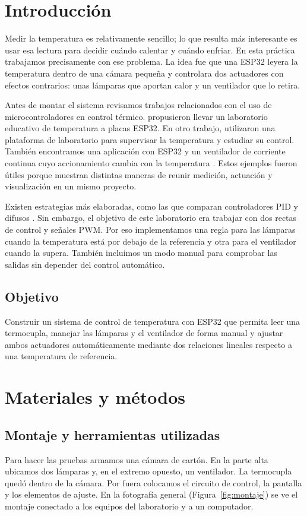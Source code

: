 \documentclass[11pt,letterpaper]{article}
\begin{document}
\section{Introducción}
Medir la temperatura es relativamente sencillo; lo que resulta más interesante es usar esa lectura para decidir cuándo calentar y cuándo enfriar. En esta práctica trabajamos precisamente con ese problema. La idea fue que una ESP32 leyera la temperatura dentro de una cámara pequeña y controlara dos actuadores con efectos contrarios: unas lámparas que aportan calor y un ventilador que lo retira.

Antes de montar el sistema revisamos trabajos relacionados con el uso de microcontroladores en control térmico. \textcite{fonseca2022} propusieron llevar un laboratorio educativo de temperatura a placas ESP32. En otro trabajo, \textcite{rahmat2023} utilizaron una plataforma de laboratorio para supervisar la temperatura y estudiar su control. También encontramos una aplicación con ESP32 y un ventilador de corriente continua cuyo accionamiento cambia con la temperatura \parencite{azmi2025}. Estos ejemplos fueron útiles porque muestran distintas maneras de reunir medición, actuación y visualización en un mismo proyecto.

Existen estrategias más elaboradas, como las que comparan controladores PID y difusos \parencite{salve2026}. Sin embargo, el objetivo de este laboratorio era trabajar con dos rectas de control y señales PWM. Por eso implementamos una regla para las lámparas cuando la temperatura está por debajo de la referencia y otra para el ventilador cuando la supera. También incluimos un modo manual para comprobar las salidas sin depender del control automático.

\subsection{Objetivo}
Construir un sistema de control de temperatura con ESP32 que permita leer una termocupla, manejar las lámparas y el ventilador de forma manual y ajustar ambos actuadores automáticamente mediante dos relaciones lineales respecto a una temperatura de referencia.

\section{Materiales y métodos}
\subsection{Montaje y herramientas utilizadas}
Para hacer las pruebas armamos una cámara de cartón. En la parte alta ubicamos dos lámparas y, en el extremo opuesto, un ventilador. La termocupla quedó dentro de la cámara. Por fuera colocamos el circuito de control, la pantalla y los elementos de ajuste. En la fotografía general (Figura~\ref{fig:montaje}) se ve el montaje conectado a los equipos del laboratorio y a un computador.
\end{document}
